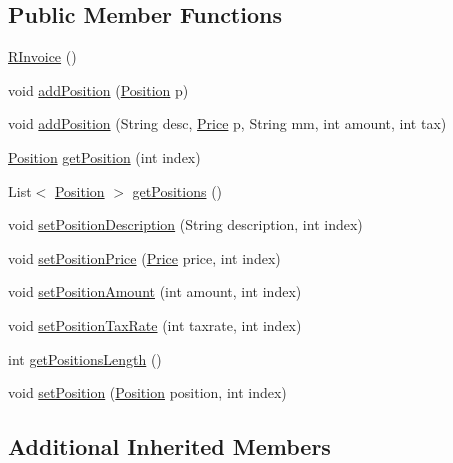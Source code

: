 \subsection*{Public Member Functions}
\begin{DoxyCompactItemize}
\item 
\hyperlink{class_reduced_invoice_1_1_r_invoice_a382c34ce7698a3e5cc9301c8cc3a5828}{R\+Invoice} ()
\item 
void \hyperlink{class_reduced_invoice_1_1_r_invoice_ae51bf96a9fc6c76ba5d79a813f4a1da0}{add\+Position} (\hyperlink{class_reduced_invoice_1_1_position}{Position} p)
\item 
void \hyperlink{class_reduced_invoice_1_1_r_invoice_aac8d8e74616bac5d81e446d47b31d5e7}{add\+Position} (String desc, \hyperlink{class_reduced_invoice_1_1_price}{Price} p, String mm, int amount, int tax)
\item 
\hyperlink{class_reduced_invoice_1_1_position}{Position} \hyperlink{class_reduced_invoice_1_1_r_invoice_a552d88c5808181f8fe3ca72772b5aff6}{get\+Position} (int index)
\item 
List$<$ \hyperlink{class_reduced_invoice_1_1_position}{Position} $>$ \hyperlink{class_reduced_invoice_1_1_r_invoice_a55b11262453617b33490afbc040761f6}{get\+Positions} ()
\item 
void \hyperlink{class_reduced_invoice_1_1_r_invoice_ab9c5e05457fa8a64a6ffcd8d6261e2a0}{set\+Position\+Description} (String description, int index)
\item 
void \hyperlink{class_reduced_invoice_1_1_r_invoice_a9c47d95997895b056a0e84741313dc0a}{set\+Position\+Price} (\hyperlink{class_reduced_invoice_1_1_price}{Price} price, int index)
\item 
void \hyperlink{class_reduced_invoice_1_1_r_invoice_ac463aa248993dd296ba9ea81356726b4}{set\+Position\+Amount} (int amount, int index)
\item 
void \hyperlink{class_reduced_invoice_1_1_r_invoice_a7b553ca5131f6059b022f9815be42c17}{set\+Position\+Tax\+Rate} (int taxrate, int index)
\item 
int \hyperlink{class_reduced_invoice_1_1_r_invoice_a3df22a621cc8ed79efa13bcb6284cadc}{get\+Positions\+Length} ()
\item 
void \hyperlink{class_reduced_invoice_1_1_r_invoice_a263bac524d7b762b58c124def1a20325}{set\+Position} (\hyperlink{class_reduced_invoice_1_1_position}{Position} position, int index)
\end{DoxyCompactItemize}
\subsection*{Additional Inherited Members}


